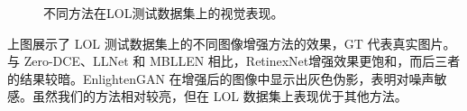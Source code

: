 \documentclass[CJK,aspectratio=169]{beamer}  %
\begin{document}
\begin{frame}
\begin{figure}
\begin{minipage}{0.19\textwidth}
			\caption*{\tiny (j) GT}
			\label{fig: GT}	
		\end{minipage}
		\captionsetup{font=scriptsize}
		\caption{
			\label{fig: LOL}
			\tiny 不同方法在LOL测试数据集上的视觉表现。
		}
	\end{figure}
	
	\vspace{-0.3cm}
	
	{ \yahei 上图展示了 LOL 测试数据集上的不同图像增强方法的效果，GT 代表真实图片。与 Zero-DCE、LLNet 和 MBLLEN 相比，RetinexNet增强效果更饱和，而后三者的结果较暗。EnlightenGAN 在增强后的图像中显示出灰色伪影，表明对噪声敏感。虽然我们的方法相对较亮，但在 LOL 数据集上表现优于其他方法。}
	
	\end{frame}
	
%		
%		
%					
%					
%					
%					
%					
%		
	
\end{document}
